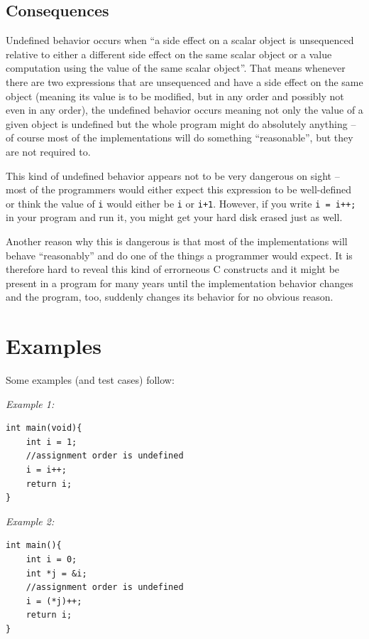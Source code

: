 \section{Consequences}
Undefined behavior occurs when ``a side effect on a scalar object is unsequenced relative to either a different side effect on the same scalar object or a value computation using the value of the same scalar object''.\cite{WG14N1570} That means whenever there are two expressions that are unsequenced and have a side effect on the same object (meaning its value is to be modified, but in any order and possibly not even in any order), the undefined behavior occurs meaning not only the value of a given object is undefined but the whole program might do absolutely anything -- of course most of the implementations will do something ``reasonable'', but they are not required to.

This kind of undefined behavior appears not to be very dangerous on sight -- most of the programmers would either expect this expression to be well-defined or think the value of \verb|i| would either be \verb|i| or \verb|i+1|.
However, if you write \verb|i = i++;| in your program and run it, you might get your hard disk erased just as well.

Another reason why this is dangerous is that most of the implementations will behave ``reasonably'' and do one of the things a programmer would expect. It is therefore hard to reveal this kind of errorneous C constructs and it might be present in a program for many years until the implementation behavior changes and the program, too, suddenly changes its behavior for no obvious reason.

\chapter{Examples}
Some examples (and test cases) follow:

\emph{Example 1:}
\begin{lstlisting}
int main(void){
	int i = 1;
    //assignment order is undefined
	i = i++;
	return i;
}
\end{lstlisting}

\emph{Example 2:}
\begin{lstlisting}
int main(){
	int i = 0;
	int *j = &i;
    //assignment order is undefined
	i = (*j)++;
    return i;
}

\end{lstlisting}

